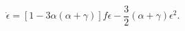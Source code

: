 \begin{equation}
\dot\epsilon
   =  \left[ 1 - 3\alpha (\alpha + \gamma)
      \right]f\epsilon
     -\frac{3}{2}(\alpha + \gamma) \epsilon^2.
\end{equation}

